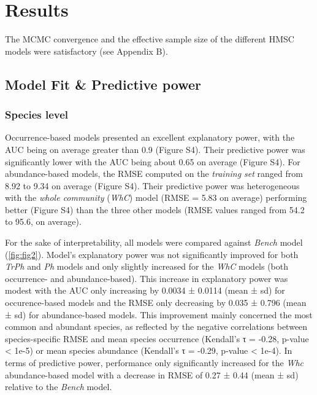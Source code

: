 \documentclass[9pt,biorxiv,doublespacing,lineno,endfloat]{lapreprint}
\begin{document}
\hypertarget{results}{%
\section{Results}\label{results}}

The MCMC convergence and the effective sample size of the different HMSC
models were satisfactory (see Appendix B).

\hypertarget{model-fit-predictive-power}{%
\subsection{Model Fit \& Predictive
power}\label{model-fit-predictive-power}}

\hypertarget{species-level}{%
\subsubsection{Species level}\label{species-level}}

Occurrence-based models presented an excellent explanatory power, with
the AUC being on average greater than 0.9 (Figure S4). Their predictive
power was significantly lower with the AUC being about 0.65 on average
(Figure S4). For abundance-based models, the RMSE computed on the
\emph{training set} ranged from 8.92 to 9.34 on average (Figure S4).
Their predictive power was heterogeneous with the \emph{whole community}
(\emph{WhC}) model (RMSE = 5.83 on average) performing better (Figure
S4) than the three other models (RMSE values ranged from 54.2 to 95.6,
on average).

For the sake of interpretability, all models were compared against
\emph{Bench} model (\cref{fig:fig2}). Model's explanatory power was not
significantly improved for both \emph{TrPh} and \emph{Ph} models and
only slightly increased for the \emph{WhC} models (both occurrence- and
abundance-based). This increase in explanatory power was modest with the
AUC only increasing by 0.0034 ± 0.0114 (mean ± sd) for occurence-based
models and the RMSE only decreasing by 0.035 ± 0.796 (mean ± sd) for
abundance-based models. This improvement mainly concerned the most
common and abundant species, as reflected by the negative correlations
between species-specific RMSE and mean species occurrence (Kendall's τ =
-0.28, p-value \textless{} 1e-5) or mean species abundance (Kendall's τ
= -0.29, p-value \textless{} 1e-4). In terms of predictive power,
performance only significantly increased for the \emph{Whc}
abundance-based model with a decrease in RMSE of 0.27 ± 0.44 (mean ± sd)
relative to the \emph{Bench} model.
\end{document}
